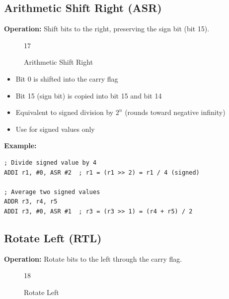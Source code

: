\subsection{Arithmetic Shift Right (ASR)}

\textbf{Operation:} Shift bits to the right, preserving the sign bit (bit 15).

\begin{figure}[H]
	\centering
	\begin{bytefield}[bitwidth=1.2em]{17}
		 \\
	\end{bytefield}
	\caption{Arithmetic Shift Right}
\end{figure}

\begin{itemize}
	\item Bit 0 is shifted into the carry flag
	\item Bit 15 (sign bit) is copied into bit 15 and bit 14
	\item Equivalent to signed division by $2^n$ (rounds toward negative infinity)
	\item Use for signed values only
\end{itemize}

\textbf{Example:}
\begin{lstlisting}
; Divide signed value by 4
ADDI r1, #0, ASR #2  ; r1 = (r1 >> 2) = r1 / 4 (signed)

; Average two signed values
ADDR r3, r4, r5
ADDI r3, #0, ASR #1  ; r3 = (r3 >> 1) = (r4 + r5) / 2
\end{lstlisting}

\subsection{Rotate Left (RTL)}

\textbf{Operation:} Rotate bits to the left through the carry flag.

\begin{figure}[H]
	\centering
	\begin{bytefield}[bitwidth=1.2em]{18}
		 \\
	\end{bytefield}
	\caption{Rotate Left}
\end{figure}

